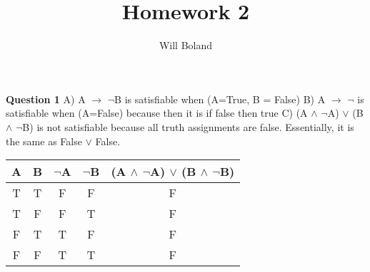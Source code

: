 \documentclass{article}
\begin{document}
\title{Homework 2}
\author{Will Boland}
\maketitle

\textbf{Question 1}\newline
A) A $\rightarrow$ $\neg$B is satisfiable when (A=True, B = False)\newline
B) A $\rightarrow$ $\neg$ is satisfiable when (A=False) because then it is if false then true\newline
C) (A $\wedge$ $\neg$A) $\lor$ (B $\wedge$ $\neg$B) is not satisfiable because all truth assignments are false. Essentially, it is the same as False $\lor$ False.\newline
\begin{center}
\begin{tabular}{ |c|c|c|c|c| } 
 \hline
 A & B & $\neg$A & $\neg$B & (A $\wedge$ $\neg$A) $\lor$ (B $\wedge$ $\neg$B) \\ 
\hline
 T & T & F & F & F\\ 
 T & F & F & T & F\\ 
 F & T & T & F & F\\
 F & F & T & T & F\\
 \hline
\end{tabular}
\end{center}
\end{document}
